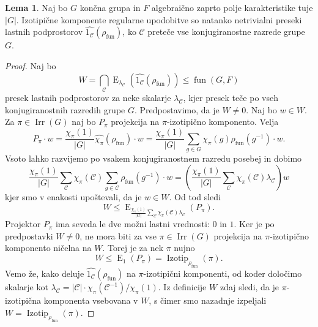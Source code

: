 \documentclass[11pt]{book}
\def\conclass{\mathcal{C}}
\DeclareMathOperator\Izotip{Izotip}
\DeclareMathOperator\Irr{Irr}
\DeclareMathOperator\Eigenspace{E}
\DeclareMathOperator\fun{fun}
\theoremstyle{definition}
\theoremstyle{zgled}
\theoremstyle{odprtproblem}
\theoremstyle{domacanaloga}
\newenvironment{dokaz}
    {\color{siva}\begin{proof}}
    {\end{proof}}
\theoremstyle{izrek}
\newtheorem*{lema}{Lema}
\begin{document}
\begin{lema}
Naj bo $G$ končna grupa in $F$ algebraično zaprto polje karakteristike tuje $|G|$. Izotipične komponente regularne upodobitve so natanko netrivialni preseki lastnih podprostorov $\widehat{1_{\conclass}}(\rho_{\fun})$, ko $\conclass$ preteče vse konjugiranostne razrede grupe $G$.
\end{lema}
\begin{dokaz}
Naj bo
\[
    \textstyle W = \bigcap_{\conclass} \Eigenspace_{\lambda_{\conclass}}\left(\widehat{1_{\conclass}}(\rho_{\fun})\right) \leq \fun(G,F)
\]
presek lastnih podprostorov za neke skalarje $\lambda_{\conclass}$, kjer presek teče po vseh konjugiranostnih razredih grupe $G$. Predpostavimo, da je $W \neq 0$. Naj bo $w \in W$. Za $\pi \in \Irr(G)$ naj bo $P_{\pi}$ projekcija na $\pi$-izotipično komponento. Velja
\[
    P_{\pi} \cdot w = \frac{\chi_{\pi}(1)}{|G|} \widehat{\chi_{\pi}}(\rho_{\fun}) \cdot w =
    \frac{\chi_{\pi}(1)}{|G|} \sum_{g \in G} \chi_{\pi}(g) \rho_{\fun}(g^{-1}) \cdot w.
\]
Vsoto lahko razvijemo po vsakem konjugiranostnem razredu posebej in dobimo
\[
    \frac{\chi_{\pi}(1)}{|G|} \sum_{\conclass} \chi_{\pi}(\conclass) \sum_{g \in \conclass} \rho_{\fun}(g^{-1}) \cdot w =
    \left( \frac{\chi_{\pi}(1)}{|G|} \sum_{\conclass} \chi_{\pi}(\conclass) \lambda_{\conclass} \right) w
\]
kjer smo v enakosti upoštevali, da je $w \in W$. Od tod sledi
\[
    \textstyle W \leq \Eigenspace_{\frac{\chi_{\pi}(1)}{|G|} \sum_{\conclass} \chi_{\pi}(\conclass) \lambda_{\conclass}}(P_{\pi}).
\]
Projektor $P_{\pi}$ ima seveda le dve možni lastni vrednosti: $0$ in $1$. Ker je po predpostavki $W \neq 0$, ne mora biti za vse $\pi \in \Irr(G)$ projekcija na $\pi$-izotipično komponento ničelna na $W$. Torej je za nek $\pi$ nujno
\[
    \textstyle W \leq \Eigenspace_{1}(P_{\pi}) = \Izotip_{\rho_{\fun}}(\pi).
\]
Vemo že, kako deluje $\widehat{1_{\conclass}}(\rho_{\fun})$ na $\pi$-izotipični komponenti, od koder določimo skalarje kot $\lambda_{\conclass} = |\conclass| \cdot \chi_{\pi}(\conclass^{-1})/\chi_{\pi}(1)$. Iz definicije $W$ zdaj sledi, da je $\pi$-izotipična komponenta vsebovana v $W$, s čimer smo nazadnje izpeljali $W = \Izotip_{\rho_{\fun}}(\pi)$.
\end{dokaz}
\end{document}
